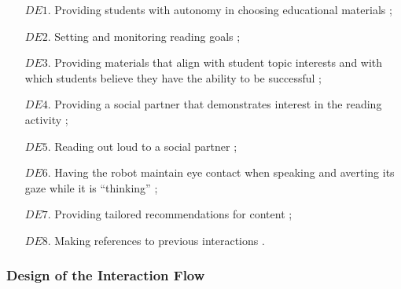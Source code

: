 \documentclass{sigchi}
\begin{document}
\begin{enumerate}[leftmargin=0ex,itemindent=5.85ex,itemsep=0.25ex]

\item[$DE1$.] Providing students with autonomy in choosing educational materials \cite{Jones:2011};
\item[$DE2$.] Setting and monitoring reading goals \cite{Cabral:2015};
\item[$DE3$.] Providing materials that align with student topic interests and with which students believe they have the ability to be successful \cite{Ainley:2002};
\item[$DE4$.] Providing a social partner that demonstrates interest in the reading activity \cite{Sansone:2005};
\item[$DE5$.] Reading out loud to a social partner \cite{Rasinski:2003};
\item[$DE6$.] Having the robot maintain eye contact when speaking and averting its gaze while it is ``thinking'' \cite{Mutlu:2011, Andrist:2014};
\item[$DE7$.] Providing tailored recommendations for content \cite{Lim:2013};
\item[$DE8$.] Making references to previous interactions \cite{Leite:2009}. 
\end{enumerate}



\subsubsection{Design of the Interaction Flow}
\end{document}
